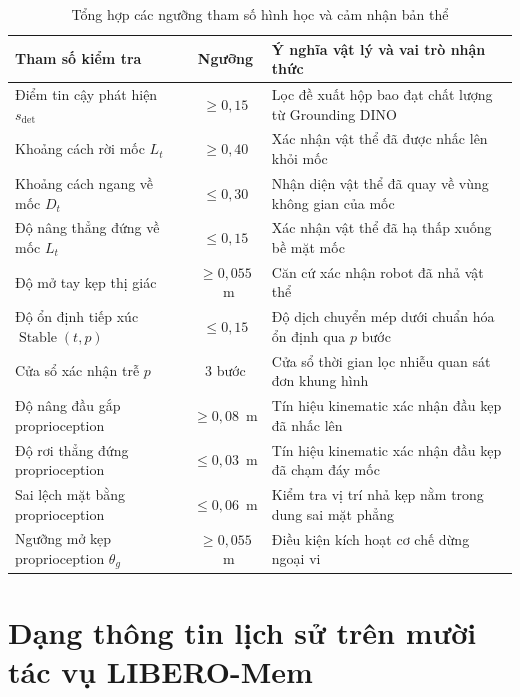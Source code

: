 \begin{table}[htbp]
\centering\small
\caption{Tổng hợp các ngưỡng tham số hình học và cảm nhận bản thể}
\label{tab:app-unified-thresholds}
\setlength{\tabcolsep}{4.5pt}
\renewcommand{\arraystretch}{1.15}
\begin{tabular}{|>{\raggedright\arraybackslash}p{4.8cm}|c|>{\raggedright\arraybackslash}p{7.6cm}|}
\hline
\textbf{Tham số kiểm tra} & \textbf{Ngưỡng} & \textbf{Ý nghĩa vật lý và vai trò nhận thức} \\ \hline
Điểm tin cậy phát hiện $s_{\mathrm{det}}$ & $\ge 0{,}15$ & Lọc đề xuất hộp bao đạt chất lượng từ Grounding DINO \\ \hline
Khoảng cách rời mốc $L_t$ & $\ge 0{,}40$ & Xác nhận vật thể đã được nhấc lên khỏi mốc \\ \hline
Khoảng cách ngang về mốc $D_t$ & $\le 0{,}30$ & Nhận diện vật thể đã quay về vùng không gian của mốc \\ \hline
Độ nâng thẳng đứng về mốc $L_t$ & $\le 0{,}15$ & Xác nhận vật thể đã hạ thấp xuống bề mặt mốc \\ \hline
Độ mở tay kẹp thị giác & $\ge 0{,}055$~m & Căn cứ xác nhận robot đã nhả vật thể \\ \hline
Độ ổn định tiếp xúc $\operatorname{Stable}(t, p)$ & $\le 0{,}15$ & Độ dịch chuyển mép dưới chuẩn hóa ổn định qua $p$ bước \\ \hline
Cửa sổ xác nhận trễ $p$ & 3 bước & Cửa sổ thời gian lọc nhiễu quan sát đơn khung hình \\ \hline
Độ nâng đầu gắp proprioception & $\ge 0{,}08$~m & Tín hiệu kinematic xác nhận đầu kẹp đã nhấc lên \\ \hline
Độ rơi thẳng đứng proprioception & $\le 0{,}03$~m & Tín hiệu kinematic xác nhận đầu kẹp đã chạm đáy mốc \\ \hline
Sai lệch mặt bằng proprioception & $\le 0{,}06$~m & Kiểm tra vị trí nhả kẹp nằm trong dung sai mặt phẳng \\ \hline
Ngưỡng mở kẹp proprioception $\theta_g$ & $\ge 0{,}055$~m & Điều kiện kích hoạt cơ chế dừng ngoại vi \\ \hline
\end{tabular}
\end{table}

\section{Dạng thông tin lịch sử trên mười tác vụ LIBERO-Mem}
\label{sec:app-task-families}

